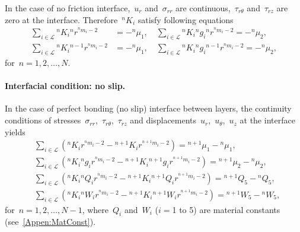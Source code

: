 \documentclass[preprint,10pt,times]{elsarticle}
\numberwithin{equation}{section}
\renewcommand{\>}{$\Rightarrow$}
\begin{document}
In the case of no friction interface,~$u_r$ and~$\sigma_{rr}$ are continuous,~$\tau_{r\theta}$ and~$\tau_{rz}$ are zero at the interface. Therefore~${}^{n}\!{K_{i}}$ satisfy following equations
\begin{subequations}
	\begin{align}
	\sum_{i \in \mathcal{L}} {}^{n}\!{K_{i}} {}^{n}\!{r}^{{}^{n}\!{m_{i}}-2} & = -{}^{n}\!{\mu_{1}}, \quad
	\sum_{i \in \mathcal{L}} {}^{n}\!{K_{i}} {}^{n}\!{g_{i}} {}^{n}\!{r}^{{}^{n}\!{m_{i}}-2} = -{}^{n}\!{\mu_{2}}, \\
	\sum_{i \in \mathcal{L}} {}^{n}\!{K_{i}} {}^{n-1}\!{r}^{{}^{n}\!{m_{i}}-2} & = -{}^{n}\!{\mu_{1}}, \quad
	\sum_{i \in \mathcal{L}} {}^{n}\!{K_{i}} {}^{n}\!{g_{i}} {}^{n-1}\!{r}^{{}^{n}\!{m_{i}}-2} = -{}^{n}\!{\mu_{2}},
	\end{align}
	\label{eq:nofriction_interface}
\end{subequations}
for~$n = 1,2,\dots,N$.


\paragraph{Interfacial condition: no slip.}

In the case of perfect bonding (no slip) interface between layers, the continuity conditions of stresses~$\sigma_{rr}$,~$\tau_{r\theta}$,~$\tau_{rz}$ and displacements~$u_{r}$,~$u_{\theta}$,~$u_z$ at the interface yields
\begin{subequations}
	\begin{align}
	& \sum_{i \in \mathcal{L}} \left( {}^{n}\!{K_{i}} r^{{}^{n}\!{m_{i}}-2} - {}^{n+1}\!{K_{i}} r^{{}^{n+1}\!{m_{i}}-2} \right) = {}^{n+1}\!{\mu_{1}}
  - {}^{n}\!{\mu_{1}}, \\
	& \sum_{i \in \mathcal{L}} \left( {}^{n}\!{K_{i}} {}^{n}\!{g_{i}} r^{{}^{n}\!{m_{i}}-2} - {}^{n+1}\!{K_{i}} {}^{n+1}\!{g_{i}} r^{{}^{n+1}\!{m_{i}}-2} \right) = {}^{n+1}\!{\mu_{2}} - {}^{n}\!{\mu_{2}}, \\
	& \sum_{i \in \mathcal{L}} \left( {}^{n}\!{K_{i}} {}^{n}\!{Q_{i}} r^{{}^{n}\!{m_{i}}-2} - {}^{n+1}\!{K_{i}} {}^{n+1}\!{Q_{i}} r^{{}^{n+1}\!{m_{i}}-2} \right) = {}^{n+1}\!{Q_{5}} - {}^{n}\!{Q_{5}}, \\
	& \sum_{i \in \mathcal{L}} \left( {}^{n}\!{K_{i}} {}^{n}\!{W_{i}} r^{{}^{n}\!{m_{i}}-2} - {}^{n+1}\!{K_{i}} {}^{n+1}\!{W_{i}} r^{{}^{n+1}\!{m_{i}}-2} \right) = {}^{n+1}\!{W_{5}} - {}^{n}\!{W_{5}},
	\end{align}
	\label{eq:noslip_interface}
\end{subequations}
for~$n = 1,2,\dots,N-1$, where~$Q_i$ and~$W_i$ ($i=$1 to 5) are material constants (see~\ref{Appen:MatConst}).
\end{document}
